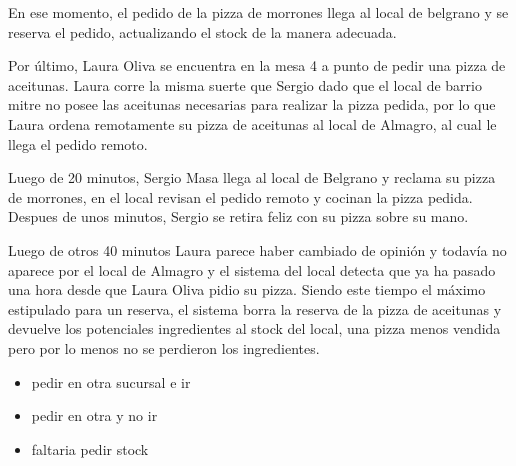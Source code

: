 \documentclass[a4paper,10pt]{article}
\begin{document}
En ese momento, el pedido de la pizza de morrones llega al local de belgrano y se reserva el pedido, actualizando el stock de la manera adecuada.

Por \'ultimo, Laura Oliva se encuentra en la mesa 4 a punto de pedir una pizza de aceitunas. Laura corre la misma suerte que Sergio dado que el local
de barrio mitre no posee las aceitunas necesarias para realizar la pizza pedida, por lo que Laura ordena remotamente su pizza de aceitunas al local de
Almagro, al cual le llega el pedido remoto.


Luego de 20 minutos, Sergio Masa llega al local de Belgrano y reclama su pizza de morrones, en el local revisan el pedido remoto y cocinan la pizza
pedida. Despues de unos minutos, Sergio se retira feliz con su pizza sobre su mano. 

Luego de otros 40 minutos Laura parece haber cambiado de opini\'on y todav\'ia no aparece por el local de Almagro y
el sistema del local detecta que ya ha pasado una hora desde que Laura Oliva pidio su pizza. Siendo este
tiempo el m\'aximo estipulado para un reserva, el sistema borra la reserva de la pizza de aceitunas y devuelve los potenciales ingredientes
al stock del local, una pizza menos vendida pero por lo menos no se perdieron los ingredientes.


 
\begin{itemize}
\item pedir en otra sucursal e ir
\item pedir en otra y no ir
\item faltaria pedir stock
\end{itemize}

\end{document}
